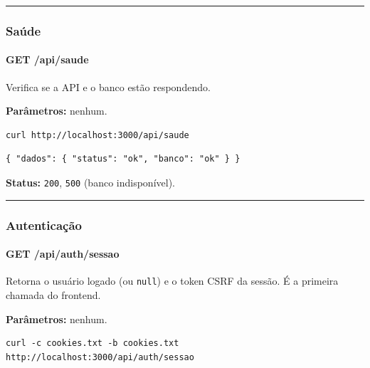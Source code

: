 \begin{center}\rule{0.5\linewidth}{0.5pt}\end{center}

\hypertarget{sauxfade}{%
\subsubsection{Saúde}\label{sauxfade}}

\hypertarget{get-apisaude}{%
\paragraph{GET /api/saude}\label{get-apisaude}}

Verifica se a API e o banco estão respondendo.

\textbf{Parâmetros:} nenhum.

\begin{Verbatim}[breaklines,breakanywhere,fontsize=\scriptsize]
curl http://localhost:3000/api/saude
\end{Verbatim}

\begin{Verbatim}[breaklines,breakanywhere,fontsize=\scriptsize]
{ "dados": { "status": "ok", "banco": "ok" } }
\end{Verbatim}

\textbf{Status:} \texttt{200}, \texttt{500} (banco indisponível).

\begin{center}\rule{0.5\linewidth}{0.5pt}\end{center}

\hypertarget{autenticauxe7uxe3o}{%
\subsubsection{Autenticação}\label{autenticauxe7uxe3o}}

\hypertarget{get-apiauthsessao}{%
\paragraph{GET /api/auth/sessao}\label{get-apiauthsessao}}

Retorna o usuário logado (ou \texttt{null}) e o token CSRF da sessão. É
a primeira chamada do frontend.

\textbf{Parâmetros:} nenhum.

\begin{Verbatim}[breaklines,breakanywhere,fontsize=\scriptsize]
curl -c cookies.txt -b cookies.txt http://localhost:3000/api/auth/sessao
\end{Verbatim}

